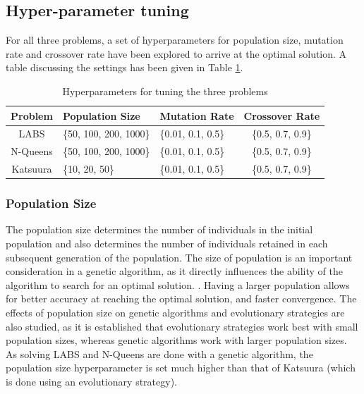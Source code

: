 \documentclass{article}
\begin{document}
\subsection{Hyper-parameter tuning}
For all three problems, a set of hyperparameters for population size, mutation rate and crossover rate have been explored to arrive at the optimal solution. A table discussing the settings has been given in Table \ref{tab:hyperparameter-tuning}. 
\begin{table}[h!]
    \centering
    \begin{tabular}{|c|l|l|c|} \hline 
         \textbf{Problem}
&   \textbf{Population Size} &\textbf{Mutation Rate}   &\textbf{Crossover Rate}  \\ \hline
         LABS
&   \{50, 100, 200, 1000\}  &\{0.01, 0.1, 0.5\} &\{0.5, 0.7, 0.9\} \\ \hline
         N-Queens
&   \{50, 100, 200, 1000\}  &\{0.01, 0.1, 0.5\} &\{0.5, 0.7, 0.9\} \\ \hline  
         Katsuura&       \{10, 20, 50\}&\{0.01, 0.1, 0.5\} &\{0.5, 0.7, 0.9\} \\ \hline
    \end{tabular}
    \caption{Hyperparameters for tuning the three problems}
    \label{tab:hyperparameter-tuning}
\end{table}

\subsubsection{Population Size}
The population size determines the number of individuals in the initial population and also determines the number of individuals retained in each subsequent generation of the population. The size of population is an important consideration in a genetic algorithm, as it directly influences the ability of the algorithm to search for an optimal solution. \cite{RAJAKUMAR2013288}. Having a larger population allows for better accuracy at reaching the optimal solution, and faster convergence. The effects of population size on genetic algorithms and evolutionary strategies are also studied, as it is established that evolutionary strategies work best with small population sizes, whereas genetic algorithms work with larger population sizes.  \\
As solving LABS and N-Queens are done with a genetic algorithm, the population size hyperparameter is set much higher than that of Katsuura (which is done using an evolutionary strategy). 
\end{document}
